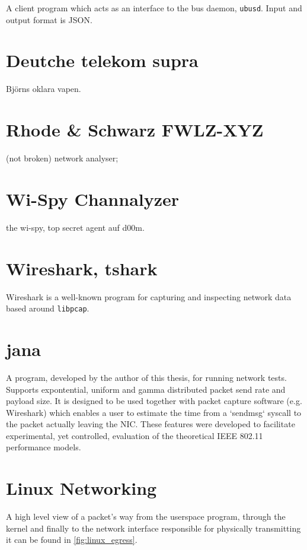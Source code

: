 A client program which acts as an interface to the bus daemon, \texttt{ubusd}.
Input and output format is JSON.

\section{Deutche telekom supra}

Björns oklara vapen.

\section{Rhode \& Schwarz FWLZ-XYZ}

(not broken) network analyser;

\section{Wi-Spy Channalyzer}

the wi-spy, top secret agent auf d00m.

\section{Wireshark, tshark}

Wireshark is a well-known program for capturing and inspecting network data
based around \texttt{libpcap}.

\section{jana}

A program, developed by the author of this thesis, for running network tests.
Supports expontential, uniform and gamma distributed packet send rate and
payload size. It is designed to be used together with packet capture software
(e.g. Wireshark) which enables a user to estimate the time from a `sendmsg`
syscall to the packet actually leaving the NIC. These features were developed
to facilitate experimental, yet controlled, evaluation of the theoretical IEEE
802.11 performance models.

\section{Linux Networking}

A high level view of a packet's way from the userspace program, through the
kernel and finally to the network interface responsible for physically
transmitting it can be found in \ref{fig:linux_egress}.

